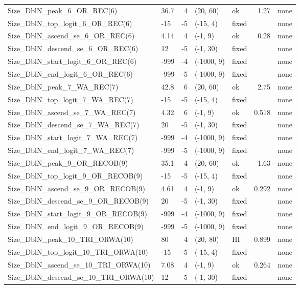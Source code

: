 \documentclass[
]{scrartcl}
\begin{document}
\begin{landscape}
\begin{longtable}{llrllrl}
Size\_DblN\_peak\_6\_OR\_REC(6) & 36.7 & 4 & (20, 60) & ok & 1.27 & none \\ 
Size\_DblN\_top\_logit\_6\_OR\_REC(6) & -15 & -5 & (-15, 4) & fixed &  & none \\ 
Size\_DblN\_ascend\_se\_6\_OR\_REC(6) & 4.14 & 4 & (-1, 9) & ok & 0.28 & none \\ 
Size\_DblN\_descend\_se\_6\_OR\_REC(6) & 12 & -5 & (-1, 30) & fixed &  & none \\ 
Size\_DblN\_start\_logit\_6\_OR\_REC(6) & -999 & -4 & (-1000, 9) & fixed &  & none \\ 
Size\_DblN\_end\_logit\_6\_OR\_REC(6) & -999 & -5 & (-1000, 9) & fixed &  & none \\ 
Size\_DblN\_peak\_7\_WA\_REC(7) & 42.8 & 6 & (20, 60) & ok & 2.75 & none \\ 
Size\_DblN\_top\_logit\_7\_WA\_REC(7) & -15 & -5 & (-15, 4) & fixed &  & none \\ 
Size\_DblN\_ascend\_se\_7\_WA\_REC(7) & 4.32 & 6 & (-1, 9) & ok & 0.518 & none \\ 
Size\_DblN\_descend\_se\_7\_WA\_REC(7) & 20 & -5 & (-1, 30) & fixed &  & none \\ 
Size\_DblN\_start\_logit\_7\_WA\_REC(7) & -999 & -4 & (-1000, 9) & fixed &  & none \\ 
Size\_DblN\_end\_logit\_7\_WA\_REC(7) & -999 & -5 & (-1000, 9) & fixed &  & none \\ 
Size\_DblN\_peak\_9\_OR\_RECOB(9) & 35.1 & 4 & (20, 60) & ok & 1.63 & none \\ 
Size\_DblN\_top\_logit\_9\_OR\_RECOB(9) & -15 & -5 & (-15, 4) & fixed &  & none \\ 
Size\_DblN\_ascend\_se\_9\_OR\_RECOB(9) & 4.61 & 4 & (-1, 9) & ok & 0.292 & none \\ 
Size\_DblN\_descend\_se\_9\_OR\_RECOB(9) & 20 & -5 & (-1, 30) & fixed &  & none \\ 
Size\_DblN\_start\_logit\_9\_OR\_RECOB(9) & -999 & -4 & (-1000, 9) & fixed &  & none \\ 
Size\_DblN\_end\_logit\_9\_OR\_RECOB(9) & -999 & -5 & (-1000, 9) & fixed &  & none \\ 
Size\_DblN\_peak\_10\_TRI\_ORWA(10) & 80 & 4 & (20, 80) & HI & 0.899 & none \\ 
Size\_DblN\_top\_logit\_10\_TRI\_ORWA(10) & -15 & -5 & (-15, 4) & fixed &  & none \\ 
Size\_DblN\_ascend\_se\_10\_TRI\_ORWA(10) & 7.08 & 4 & (-1, 9) & ok & 0.264 & none \\ 
Size\_DblN\_descend\_se\_10\_TRI\_ORWA(10) & 12 & -5 & (-1, 30) & fixed &  & none \\ 

\end{longtable}
\end{landscape}
\end{document}
